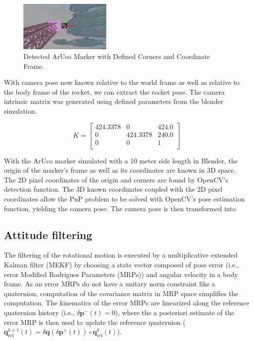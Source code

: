 \documentclass[conference]{IEEEtran}
\begin{document}
\begin{figure}[ht!] 
    \centerline{\includegraphics[width=0.4\textwidth]{detectedMarker.png}}
    \caption{Detected ArUco Marker with Defined Corners and Coordinate Frame.}
    \label{fig:marker_}
\end{figure}

With camera pose now known relative to the world frame as well as relative to the body frame of the rocket, we can extract the rocket pose. 
The camera intrinsic matrix was generated using defined parameters from the blender simulation.

\[
K = \begin{bmatrix}
424.3378 & 0 & 424.0 \\
0 & 424.3378 & 240.0 \\
0 & 0 & 1 \\
\end{bmatrix}
\]

With the ArUco marker simulated with a 10 meter side length in Blender, the origin of the marker's frame as well as its coordinates are known in 3D space. 
The 2D pixel coordinates of the origin and corners are found by OpenCV's detection function. 
The 3D known coordinates coupled with the 2D pixel coordinates allow the PnP problem to be solved with OpenCV's pose estimation function, yielding the camera pose.
The camera pose is then transformed into 


\subsection{Attitude filtering}

The filtering of the rotational motion is executed by a multiplicative extended Kalman filter (MEKF) \cite{markley2003mekf} by choosing a state vector composed of pose error (i.e., error Modified Rodrigues Parameters (MRPs)) and angular velocity in a body frame.
As an error MRPs do not have a unitary norm constraint like a quaternion, computation of the covariance matrix in MRP space simplifies the computation. 
The kinematics of the error MRPs are linearized along the reference quaternion history (i.e., $\delta \boldsymbol{p}^{-}(t) = 0$), where the a posteriori estimate of the error MRP is then used to update the reference quaternion ($\boldsymbol{q}_{\text{ref}}^{k+1}(t) = \delta \boldsymbol{q}(\delta \boldsymbol{p}^{+}(t)) \circ \boldsymbol{q}_{\text{ref}}^k(t)$). 
\end{document}
